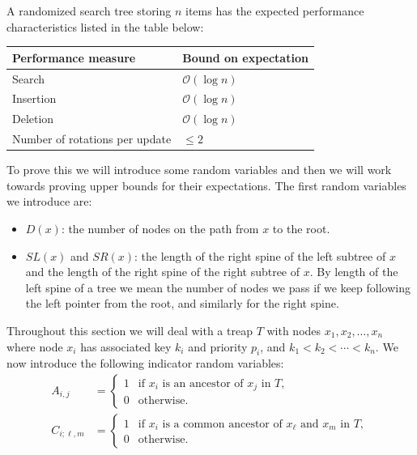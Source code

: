 \begin{thm} \label{thm:treapmainthm}
A randomized search tree storing $n$ items has the expected performance characteristics listed in the table below:
\begin{table}[h!]
\centering
\begin{tabular}{ll}
\textbf{Performance measure}   & \textbf{Bound on expectation} \\ \hline
Search                         & $\mathcal{O}(\log n)$         \\
Insertion                      & $\mathcal{O}(\log n)$         \\
Deletion                       & $\mathcal{O}(\log n)$         \\
Number of rotations per update & $\leq 2$                      \\ \hline
\end{tabular}
\end{table}
\end{thm}
To prove this we will introduce some random variables and then we will work towards proving upper bounds for their expectations. The first random variables we introduce are:
\begin{itemize}
    \item $D(x)$: the number of nodes on the path from $x$ to the root.
    \item $SL(x)$ and $SR(x)$: the length of the right spine of the left subtree of $x$ and the length of the right spine of the right subtree of $x$. By length of the left spine of a tree we mean the number of nodes we pass if we keep following the left pointer from the root, and similarly for the right spine.
\end{itemize}
Throughout this section we will deal with a treap $T$ with nodes $x_1, x_2, \ldots, x_n$ where node $x_i$ has associated key $k_i$ and priority $p_i$, and $k_1 < k_2 < \cdots < k_n$. We now introduce the following indicator random variables:
\begin{align*}
    A_{i,j} &= \begin{cases}
        1 & \text{if } x_i \text{ is an ancestor of } x_j \text{ in } T, \\
        0 & \text{otherwise.}
    \end{cases} \\
    C_{i;\ell,m} &= \begin{cases}
        1 & \text{if } x_i \text{ is a common ancestor of } x_{\ell} \text{ and } x_{m} \text{ in } T, \\
        0 & \text{otherwise.}
    \end{cases}
\end{align*}
